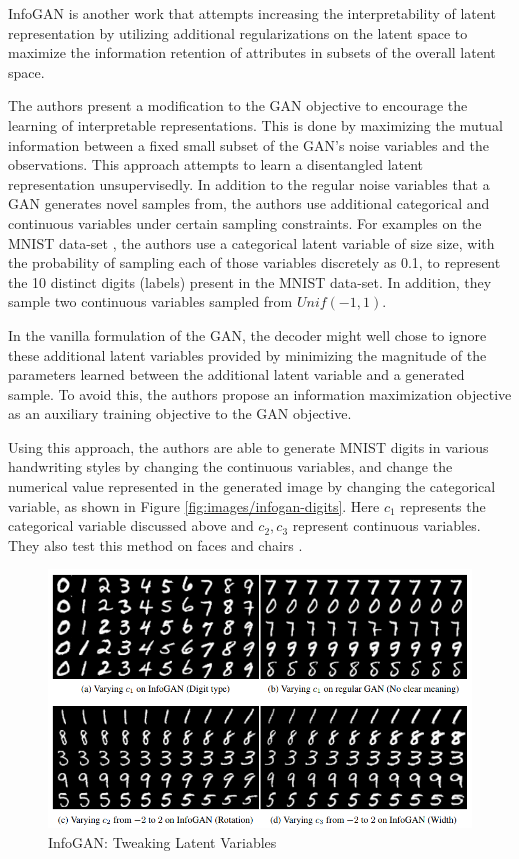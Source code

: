 InfoGAN \citep{chen2016infogan} is another work that attempts increasing the interpretability of latent representation by utilizing additional regularizations on the latent space to maximize the information retention of attributes in subsets of the overall latent space.

The authors present a modification to the GAN objective \citep{goodfellow2014generative} to encourage the learning of interpretable representations. This is done by maximizing the
mutual information between a fixed small subset of the GAN's noise variables and the observations. This approach attempts to learn a disentangled latent representation unsupervisedly. In addition to the regular noise variables that a GAN generates novel samples from, the authors use additional categorical and continuous variables under certain sampling constraints. For examples on the MNIST data-set \citep{lecun2010mnist}, the authors use a categorical latent variable of size size, with the probability of sampling each of those variables discretely as 0.1, to represent the 10 distinct digits (labels) present in the MNIST data-set. In addition, they sample two continuous variables sampled from $Unif(-1, 1)$.

In the vanilla formulation of the GAN, the decoder might well chose to ignore these additional latent variables provided by minimizing the magnitude of the parameters learned between the additional latent variable and a generated sample. To avoid this, the authors propose an information maximization objective as an auxiliary training objective to the GAN objective.

Using this approach, the authors are able to generate MNIST digits in various handwriting styles by changing the continuous variables, and change the numerical value represented in the generated image by changing the categorical variable, as shown in Figure \ref{fig:images/infogan-digits}. Here $c_1$ represents the categorical variable discussed above and $c_2, c_3$ represent continuous variables. They also test this method on faces \citep{liu2015deep,paysan20093d} and chairs \citep{aubry2014seeing}.

\begin{figure}[ht]
	\centering
	\includegraphics[width=\textwidth]{images/infogan-digits}
	\caption{\label{fig:infogan-digits} InfoGAN: Tweaking Latent Variables}
\end{figure}


